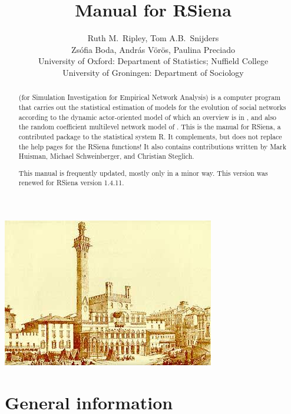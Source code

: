 \documentclass[a4paper,fleqn,11pt]{article}
\title{{\Huge Manual for \textsf{RSiena} } }
\author{\Large Ruth M.\ Ripley, Tom A.B.\ Snijders\\[1ex]
        \Large Zs\'{o}fia Boda, Andr\'{a}s V\"{o}r\"{o}s, Paulina Preciado  \\[4ex]
       {\large University of Oxford: Department of Statistics; Nuffield College}\\[1ex]
       {\large University of Groningen: Department of Sociology}\\[1ex]
    }
\newcommand{\+}{\, + \,}
\newcommand{\Rn}{{\sf R}}
\newcommand{\rs}{{\sf RSiena}}
\newcommand{\RS}{{\sf \textsf{RSiena} }}
\newcommand{\SI}{{\sf SIENA }}
\begin{document}

\maketitle

\vfill
\begin{center}
\includegraphics*[scale=3]{ilcampo.jpg}
\end{center}
\vfill

\begin{abstract}
\noindent \SI (for {\sf Simulation Investigation for Empirical
Network Analysis}) is a computer program that carries out the
statistical estimation of models for the evolution of social
networks according to the dynamic actor-oriented model of
which an overview is in \citet{Snijders2017},
and also the random coefficient multilevel network model of
\citet{KoskinenSnijders2023}.
This is the manual for \rs,
a contributed package to the statistical system \Rn.
It complements, but does not replace the help pages
for the \RS functions!
It also contains contributions written
by Mark Huisman, Michael Schweinberger, and Christian Steglich.

This manual is frequently updated, mostly only in a minor way.
This version was renewed for \RS version 1.4.11.
\end{abstract}




\vfill
\newpage
\tableofcontents
\newpage

\makeatletter
\def\@linkcolor{lc}
\makeatother


\section{General information}
\end{document}

